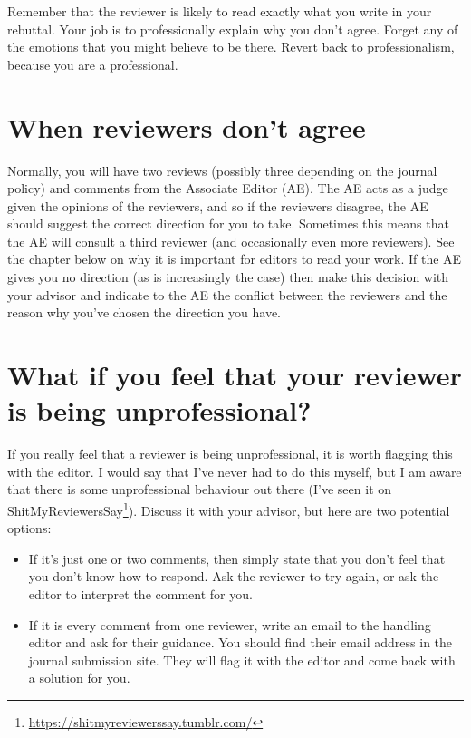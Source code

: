 \documentclass[
]{krantz}
\providecommand{\tightlist}{%
  \setlength{\itemsep}{0pt}\setlength{\parskip}{0pt}}
\renewcommand{\href}[2]{#2\footnote{\url{#1}}}
\begin{document}
Remember that the reviewer is likely to read exactly what you write in your rebuttal. Your job is to professionally explain why you don't agree. Forget any of the emotions that you might believe to be there. Revert back to professionalism, because you are a professional.

\hypertarget{when-reviewers-dont-agree}{%
\section{When reviewers don't agree}\label{when-reviewers-dont-agree}}

Normally, you will have two reviews (possibly three depending on the journal policy) and comments from the Associate Editor (AE). The AE acts as a judge given the opinions of the reviewers, and so if the reviewers disagree, the AE should suggest the correct direction for you to take. Sometimes this means that the AE will consult a third reviewer (and occasionally even more reviewers). See the chapter below on why it is important for editors to read your work. If the AE gives you no direction (as is increasingly the case) then make this decision with your advisor and indicate to the AE the conflict between the reviewers and the reason why you've chosen the direction you have.

\hypertarget{what-if-you-feel-that-your-reviewer-is-being-unprofessional}{%
\section{What if you feel that your reviewer is being unprofessional?}\label{what-if-you-feel-that-your-reviewer-is-being-unprofessional}}

If you really feel that a reviewer is being unprofessional, it is worth flagging this with the editor. I would say that I've never had to do this myself, but I am aware that there is some unprofessional behaviour out there (I've seen it on \href{https://shitmyreviewerssay.tumblr.com/}{ShitMyReviewersSay}). Discuss it with your advisor, but here are two potential options:

\begin{itemize}
\tightlist
\item
  If it's just one or two comments, then simply state that you don't feel that you don't know how to respond. Ask the reviewer to try again, or ask the editor to interpret the comment for you.
\item
  If it is every comment from one reviewer, write an email to the handling editor and ask for their guidance. You should find their email address in the journal submission site. They will flag it with the editor and come back with a solution for you.
\end{itemize}
\end{document}
